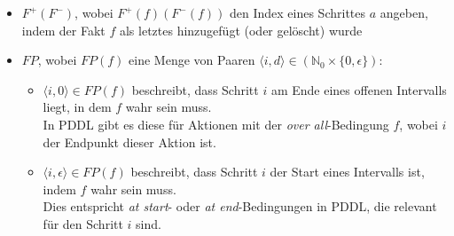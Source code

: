 \begin{itemize}
    \item $F^+(F^-)$, wobei $F^+(f)(F^-(f))$ den Index eines Schrittes $a$ angeben, indem der Fakt $f$ als letztes hinzugefügt (oder gelöscht) wurde
    \item $FP$, wobei $FP(f)$ eine Menge von Paaren $\langle i,d \rangle \in (\mathbb{N}_0 \times \{0,\epsilon\})$:\\
    \begin{itemize}
        \item $\langle i,0 \rangle \in FP(f)$ beschreibt, dass Schritt $i$ am Ende eines offenen Intervalls liegt, in dem $f$ wahr sein muss.\\
        In \ac{PDDL} gibt es diese für Aktionen mit der \emph{over all}-Bedingung $f$, wobei $i$ der Endpunkt dieser Aktion ist.
        \item $\langle i,\epsilon \rangle \in FP(f)$ beschreibt, dass Schritt $i$ der Start eines Intervalls ist, indem $f$ wahr sein muss.\\
        Dies entspricht \emph{at start}- oder \emph{at end}-Bedingungen in \ac{PDDL}, die relevant für den Schritt $i$ sind.
    \end{itemize}
\end{itemize}

